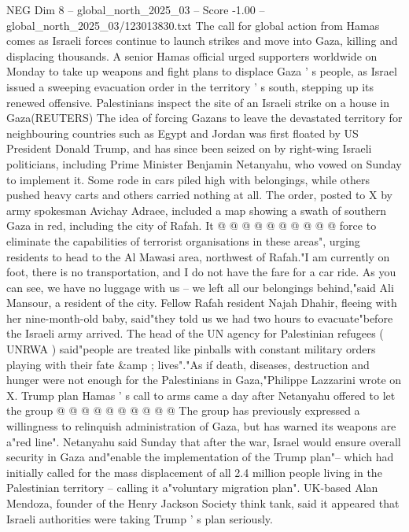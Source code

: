 \begin{textsample}{NEG Dim 8 – global\_north\_2025\_03 – Score -1.00 – global\_north\_2025\_03/123013830.txt}  \label{ex:f8_neg_123}
The call for global action from Hamas comes as Israeli forces continue to launch strikes and move into Gaza, killing and displacing thousands.
A senior Hamas official urged supporters worldwide on Monday to take up weapons and fight plans to displace Gaza ' s people, as Israel issued a sweeping evacuation order in the territory ' s south, stepping up its renewed offensive.
Palestinians inspect the site of an Israeli strike on a house in Gaza(REUTERS) The idea of forcing Gazans to leave the devastated territory for neighbouring countries such as Egypt and Jordan was first floated by US President Donald Trump, and has since been seized on by right-wing Israeli politicians, including Prime Minister Benjamin Netanyahu, who vowed on Sunday to implement it.
Some rode in cars piled high with belongings, while others pushed heavy carts and others carried nothing at all.
The order, posted to X by army spokesman Avichay Adraee, included a map showing a swath of southern Gaza in red, including the city of Rafah.
It @ @ @ @ @ @ @ @ @ @ force to eliminate the capabilities of terrorist organisations in these areas", urging residents to head to the Al Mawasi area, northwest of Rafah."I am currently on foot, there is no transportation, and I do not have the fare for a car ride.
As you can see, we have no luggage with us -- we left all our belongings behind,"said Ali Mansour, a resident of the city.
Fellow Rafah resident Najah Dhahir, fleeing with her nine-month-old baby, said"they told us we had two hours to evacuate"before the Israeli army arrived.
The head of the UN agency for Palestinian refugees ( UNRWA ) said"people are treated like pinballs with constant military orders playing with their fate \&amp ; lives"."As if death, diseases, destruction and hunger were not enough for the Palestinians in Gaza,"Philippe Lazzarini wrote on X.
Trump plan Hamas ' s call to arms came a day after Netanyahu offered to let the group @ @ @ @ @ @ @ @ @ @ The group has previously expressed a willingness to relinquish administration of Gaza, but has warned its weapons are a"red line".
Netanyahu said Sunday that after the war, Israel would ensure overall security in Gaza and"enable the implementation of the Trump plan"-- which had initially called for the mass displacement of all 2.4 million people living in the Palestinian territory -- calling it a"voluntary migration plan".
UK-based Alan Mendoza, founder of the Henry Jackson Society think tank, said it appeared that Israeli authorities were taking Trump ' s plan seriously.

\end{textsample}
